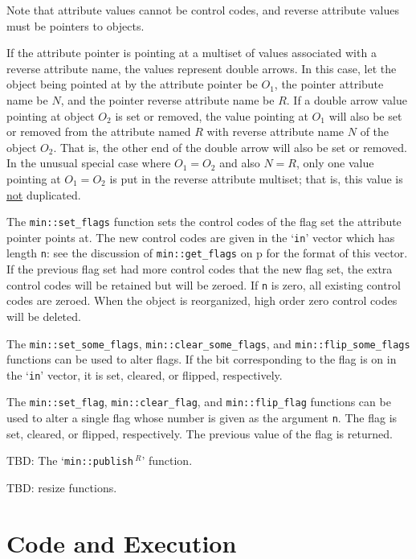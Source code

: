 \documentclass[12pt]{article}
\newcommand{\pagref}[1]{p\pageref{#1}}
\newcommand{\EOL}{\penalty \exhyphenpenalty}
\newcommand{\REL}{$\,^R$}
\begin{document}
Note that attribute values cannot be control codes, and reverse attribute
values must be pointers to objects.

If the attribute pointer is pointing at a multiset of values
associated with a reverse attribute name,
the values represent double arrows.
In this case, let the object being pointed at by the attribute pointer
be $O_1$,
the pointer attribute name be $N$, and the pointer reverse
attribute name be $R$.
If a double arrow value pointing at object $O_2$ is set or removed, the value
pointing at $O_1$ will also be set or removed from the attribute named
$R$ with
reverse attribute name $N$ of the object $O_2$.  That is, the other end of
the double arrow will also be set or removed.
In the unusual special case where $O_1=O_2$ and also $N=R$, only one value
pointing at $O_1=O_2$ is put in the reverse attribute multiset; that
is, this value is \underline{not} duplicated.

The {\tt min::\EOL set\_\EOL flags} function sets the control codes
of the flag set the attribute pointer points at.
The new control codes are given in the `{\tt in}' vector which
has length {\tt n}: see the discussion of
{\tt min::\EOL get\_\EOL flags} on \pagref{MIN::GET_FLAGS_OF_ATTR}
for the format of this vector.
If the previous flag set had more control codes that the new flag
set, the extra control codes will be retained but will be zeroed.
If {\tt n} is zero, all existing control codes are zeroed.
When the object is reorganized, high order zero control codes will
be deleted.

The {\tt min::\EOL set\_\EOL some\_\EOL flags},
{\tt min::\EOL clear\_\EOL some\_\EOL flags},
and {\tt min::\EOL flip\_\EOL some\_\EOL flags}
functions can be used to alter flags.  If the bit corresponding
to the flag is on in the `{\tt in}' vector, it is set, cleared,
or flipped, respectively.

The {\tt min::\EOL set\_\EOL flag},
{\tt min::\EOL clear\_\EOL flag},
and {\tt min::\EOL flip\_\EOL flag}
functions can be used to alter a single flag whose number is
given as the argument {\tt n}.  The flag is set, cleared,
or flipped, respectively.  The previous value of the flag is
returned.

TBD: The `{\tt min::\EOL publish\REL}' function.\label{MIN::PUBLISH}

TBD: resize functions\label{MIN::RESIZE_OF_ATTR}.

\section{Code and Execution}
\end{document}

